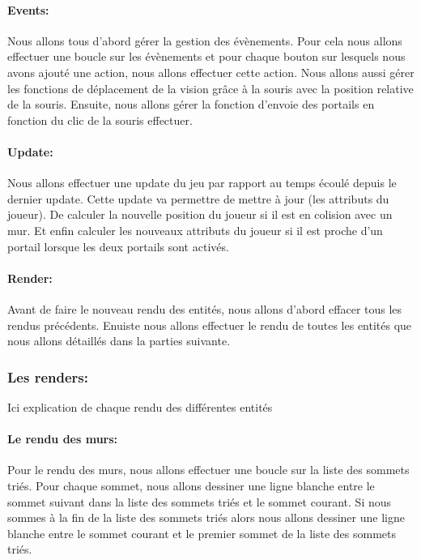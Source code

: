 \documentclass[12pt]{report}
\begin{document}
\paragraph{Events:}
Nous allons tous d'abord gérer la gestion des évènements. Pour cela nous allons effectuer une boucle sur les évènements et pour chaque bouton sur lesquels nous avons ajouté une action, nous allons effectuer cette action. Nous allons aussi gérer les fonctions de déplacement de la vision grâce à la souris avec la position relative de la souris. Ensuite, nous allons gérer la fonction d'envoie des portails en fonction du clic de la souris effectuer.

\paragraph{Update:}
Nous allons effectuer une update du jeu par rapport au temps écoulé depuis le dernier update. Cette update va permettre de mettre à jour (les attributs du joueur). De calculer la nouvelle position du joueur si il est en colision avec un mur. Et enfin calculer les nouveaux attributs du joueur si il est proche d'un portail lorsque les deux portails sont activés.

\paragraph{Render:}
Avant de faire le nouveau rendu des entités, nous allons d'abord effacer tous les rendus précédents. Enuiste nous allons effectuer le rendu de toutes les entités que nous allons détaillés dans la parties suivante.

\subsubsection{Les renders:}
Ici explication de chaque rendu des différentes entités

\paragraph{Le rendu des murs:}
Pour le rendu des murs, nous allons effectuer une boucle sur la liste des sommets triés. 
Pour chaque sommet, nous allons dessiner une ligne blanche entre le sommet suivant dans la 
liste des sommets triés et le sommet courant. Si nous sommes à la fin de la liste des sommets
triés alors nous allons dessiner une ligne blanche entre le sommet courant et le premier sommet 
de la liste des sommets triés.
\end{document}
